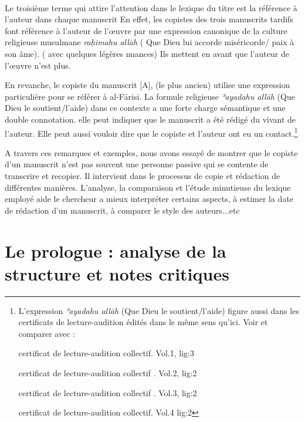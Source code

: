 \documentclass[a4paper,12pt]{report}
\begin{document}
\begin{itemize}
\begin{enumerate}
\paragraph{}
Le troisième terme qui attire l'attention dans le lexique du titre  est la référence à l'auteur dans chaque manuscrit En effet, les copistes des  trois manuscrits tardifs font référence à l'auteur de l'œuvre par une expression canonique de la culture religieuse musulmane  \textit{raḥimahu allāh } ( Que Dieu lui accorde miséricorde/ paix à son âme). ( avec quelques légères nuances) 
Ils mettent en avant que l'auteur de l'œuvre n'est plus.  

En revanche, le copiste du manuscrit [A],  (le plus ancien)  utilise une expression particulière pour se référer à al-F\=aris\=i. La formule religieuse  \textit{ʾayadahu allāh } (Que Dieu le soutient/l'aide)  dans ce contexte a  une forte charge sémantique et une double connotation. elle peut indiquer  que le manuscrit a été rédigé du vivant de l'auteur.   Elle peut aussi vouloir dire que le copiste  et l'auteur ont eu un contact.\footnote{L'expression \textit{ʾayadahu allāh } (Que Dieu le soutient/l'aide) figure aussi dans les certificats de lecture-audition édités dans le même sens qu'ici. Voir et comparer avec :

 certificat de lecture-audition collectif. Vol.1, lig:3
 
 certificat de lecture-audition collectif . Vol.2, lig:2
 
 certificat de lecture-audition collectif . Vol.3, lig:2
 
 certificat de lecture-audition collectif. Vol.4 lig:2 }


A travers ces remarques et exemples,   nous avons essayé de montrer que le copiste d'un manuscrit n'est pas souvent une personne passive qui se contente de transcrire et recopier. Il intervient dans le processus de copie et rédaction de différentes manières. L'analyse, la comparaison  et l'étude minutieuse du lexique employé aide  le chercheur  a mieux interpréter certains aspects, à estimer la date de rédaction d'un manuscrit, à comparer le style des auteurs...etc  





\section{Le prologue : analyse de la structure et notes critiques}
 

\end{enumerate}
\end{itemize}
\end{document}
